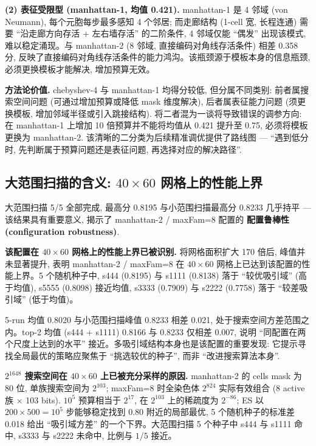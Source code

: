 \noindent\textbf{(2) 表征受限型 (manhattan-1, 均值 0.421).}
manhattan-1 是 4 邻域 (von Neumann), 每个元胞每步最多感知 4 个邻居; 而走廊结构 (1-cell 宽, 长程连通) 需要 ``沿走廊方向存活 + 左右墙存活'' 的二阶条件, 4 邻域仅能 ``偶发'' 出现该模式, 难以稳定涌现。与 manhattan-2 (8 邻域, 直接编码对角线存活条件) 相差 0.358 分, 反映了直接编码对角线存活条件的能力鸿沟。该瓶颈源于模板本身的信息瓶颈, 必须更换模板才能解决, 增加预算无效。

\noindent\textbf{方法论价值.} chebyshev-4 与 manhattan-1 均得分较低, 但分属不同类别: 前者属搜索空间问题 (可通过增加预算或降低 mask 维度解决), 后者属表征能力问题 (须更换模板, 增加邻域半径或引入跳接结构). 将二者混为一谈将导致错误的调参方向: 在 manhattan-1 上增加 10 倍预算并不能将均值从 0.421 提升至 0.75, 必须将模板更换为 manhattan-2. 该清晰的二分类为后续精准调优提供了路线图 --- ``遇到低分时, 先判断属于预算问题还是表征问题, 再选择对应的解决路径''.

\subsection{大范围扫描的含义: $40 \times 60$ 网格上的性能上界}

大范围扫描 5/5 全部完成, 最高分 0.8195 与小范围扫描最高分 0.8233 几乎持平 --- 该结果具有重要意义, 揭示了 manhattan-2 / maxFam=8 配置的 \textbf{配置鲁棒性 (configuration robustness)}.

\noindent\textbf{该配置在 $40 \times 60$ 网格上的性能上界已被识别.} 将网格面积扩大 170 倍后, 峰值并未显著提升, 表明 manhattan-2 / maxFam=8 在 $40 \times 60$ 网格上已达到该配置的性能上界。5 个随机种子中, s444 (0.8195) 与 s1111 (0.8138) 落于 ``较优吸引域'' (高于均值), s5555 (0.8098) 接近均值, s3333 (0.7909) 与 s2222 (0.7758) 落于 ``较差吸引域'' (低于均值)。

5-run 均值 0.8020 与小范围扫描峰值 0.8233 相差 0.021, 处于搜索空间方差范围之内。top-2 均值 (s444 + s1111) 0.8166 与 0.8233 仅相差 0.007, 说明 ``同配置在两个尺度上达到的水平'' 接近。多吸引域结构本身也是该配置的重要发现: 它提示寻找全局最优的策略应聚焦于 ``挑选较优的种子'', 而非 ``改进搜索算法本身''.

\noindent\textbf{$2^{1648}$ 搜索空间在 $40 \times 60$ 上已被充分采样的原因.} manhattan-2 的 cells mask 为 80 位, 单族搜索空间为 $2^{103}$; maxFam=8 时全染色体 $2^{824}$ 实际有效组合 (8 active 族 $\times$ 103 bits). $10^5$ 预算相当于 $2^{17}$, 在 $2^{103}$ 上的稀疏度为 $2^{-86}$; ES 以 $200 \times 500 = 10^5$ 步能够稳定找到 0.80 附近的局部最优, 5 个随机种子的标准差 0.018 给出 ``吸引域方差'' 的一个下界。大范围扫描 5 个种子中 s444 与 s1111 命中, s3333 与 s2222 未命中, 比例与 $1/5$ 接近。

